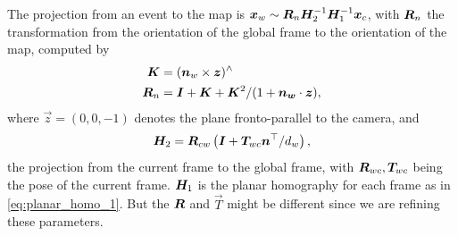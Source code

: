 The projection from an event to the map is
$\vec{x}_w \sim \mat{R}_n\mat{H}_2^{-1}\mat{H}_1^{-1}\vec{x}_c$, with
$\mat{R}_n$ the transformation from the orientation of the global
frame to the orientation of the map, computed by
\begin{align}
  \label{eq:global2map}
  \mat{K}& =(\vec{n}_w\times \vec{z})^\wedge\\
  \mat{R}_n&=\mat{I} +\mat{K} + \mat{K}^2/ (1 +  \vec{n_w}\cdot\vec{z}),
\end{align}
where $\vec{z}=(0,0,-1)$ denotes the plane fronto-parallel to the
camera, and
\begin{equation}
  \label{eq:frame2global}
  \mat{H}_2 = \mat{R}_{cw}\left(\mat{I} + \vec{T}_{wc}\vec{n}^\top/d_w\right),
\end{equation}
the projection from the current frame to the global frame, with
$\mat{R}_{wc}, \mat{T}_{wc}$ being the pose of the current
frame. $\mat{H}_1$ is the planar homography for each frame as in
\cref{eq:planar_homo_1}. But the $\mat{R}$ and $\vec{T}$ might be
different since we are refining these parameters.

